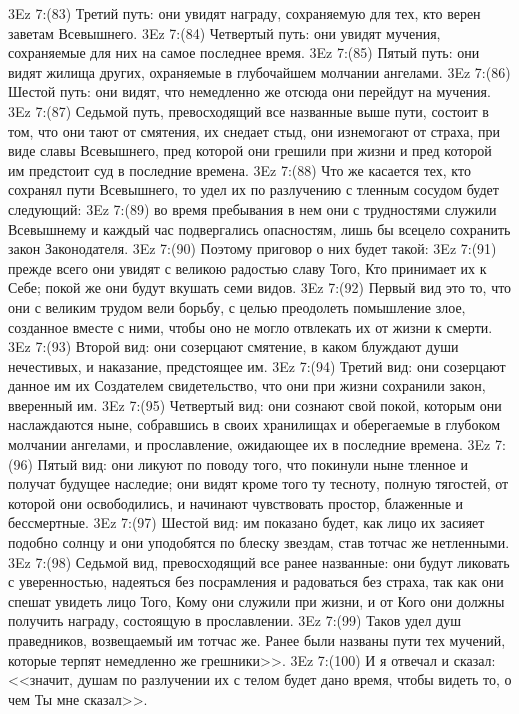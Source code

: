 \vs 3Ez 7:(83) Третий путь: они увидят награду, сохраняемую для тех, кто верен заветам Всевышнего.
\vs 3Ez 7:(84) Четвертый путь: они увидят мучения, сохраняемые для них на самое последнее время.
\vs 3Ez 7:(85) Пятый путь: они видят жилища других, охраняемые в глубочайшем молчании ангелами.
\vs 3Ez 7:(86) Шестой путь: они видят, что немедленно же отсюда они перейдут на мучения.
\vs 3Ez 7:(87) Седьмой путь, превосходящий все названные выше пути, состоит в том, что они тают от смятения, их снедает стыд, они изнемогают от страха, при виде славы Всевышнего, пред которой они грешили при жизни и пред которой им предстоит суд в последние времена.
\vs 3Ez 7:(88) Что же касается тех, кто сохранял пути Всевышнего, то удел их по разлучению с тленным сосудом будет следующий:
\vs 3Ez 7:(89) во время пребывания в нем они с трудностями служили Всевышнему и каждый час подвергались опасностям, лишь бы всецело сохранить закон Законодателя.
\vs 3Ez 7:(90) Поэтому приговор о них будет такой:
\vs 3Ez 7:(91) прежде всего они увидят с великою радостью славу Того, Кто принимает их к Себе; покой же они будут вкушать семи видов.
\vs 3Ez 7:(92) Первый вид это то, что они с великим трудом вели борьбу, с целью преодолеть помышление злое, созданное вместе с ними, чтобы оно не могло отвлекать их от жизни к смерти.
\vs 3Ez 7:(93) Второй вид: они созерцают смятение, в каком блуждают души нечестивых, и наказание, предстоящее им.
\vs 3Ez 7:(94) Третий вид: они созерцают данное им их Создателем свидетельство, что они при жизни сохранили закон, вверенный им.
\vs 3Ez 7:(95) Четвертый вид: они сознают свой покой, которым они наслаждаются ныне, собравшись в своих хранилищах и оберегаемые в глубоком молчании ангелами, и прославление, ожидающее их в последние времена.
\vs 3Ez 7:(96) Пятый вид: они ликуют по поводу того, что покинули ныне тленное и получат будущее наследие; они видят кроме того ту тесноту, полную тягостей, от которой они освободились, и начинают чувствовать простор, блаженные и бессмертные.
\vs 3Ez 7:(97) Шестой вид: им показано будет, как лицо их засияет подобно солнцу и они уподобятся по блеску звездам, став тотчас же нетленными.
\vs 3Ez 7:(98) Седьмой вид, превосходящий все ранее названные: они будут ликовать с уверенностью, надеяться без посрамления и радоваться без страха, так как они спешат увидеть лицо Того, Кому они служили при жизни, и от Кого они должны получить награду, состоящую в прославлении.
\vs 3Ez 7:(99) Таков удел душ праведников, возвещаемый им тотчас же. Ранее были названы пути тех мучений, которые терпят немедленно же грешники>>.
\vs 3Ez 7:(100) И я отвечал и сказал: <<значит, душам по разлучении их с телом будет дано время, чтобы видеть то, о чем Ты мне сказал>>.
